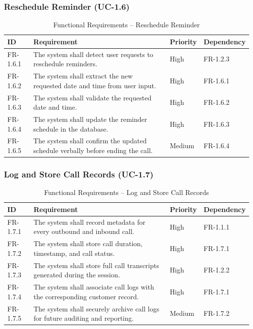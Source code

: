 \documentclass[12pt,a4paper]{report}
\begin{document}
\subsubsection{Reschedule Reminder (UC-1.6)}

\begin{table}[H]
\centering
\caption{Functional Requirements – Reschedule Reminder}
\begin{tabularx}{\textwidth}{|l|X|l|l|}
\hline
\textbf{ID} & \textbf{Requirement} & \textbf{Priority} & \textbf{Dependency} \\ \hline

FR-1.6.1 & The system shall detect user requests to reschedule reminders. & High & FR-1.2.3 \\ \hline

FR-1.6.2 & The system shall extract the new requested date and time from user input. & High & FR-1.6.1 \\ \hline

FR-1.6.3 & The system shall validate the requested date and time. & High & FR-1.6.2 \\ \hline

FR-1.6.4 & The system shall update the reminder schedule in the database. & High & FR-1.6.3 \\ \hline

FR-1.6.5 & The system shall confirm the updated schedule verbally before ending the call. & Medium & FR-1.6.4 \\ \hline

\end{tabularx}
\end{table}
\subsubsection{Log and Store Call Records (UC-1.7)}

\begin{table}[H]
\centering
\caption{Functional Requirements – Log and Store Call Records}
\begin{tabularx}{\textwidth}{|l|X|l|l|}
\hline
\textbf{ID} & \textbf{Requirement} & \textbf{Priority} & \textbf{Dependency} \\ \hline

FR-1.7.1 & The system shall record metadata for every outbound and inbound call. & High & FR-1.1.1 \\ \hline

FR-1.7.2 & The system shall store call duration, timestamp, and call status. & High & FR-1.7.1 \\ \hline

FR-1.7.3 & The system shall store full call transcripts generated during the session. & High & FR-1.2.2 \\ \hline

FR-1.7.4 & The system shall associate call logs with the corresponding customer record. & High & FR-1.7.1 \\ \hline

FR-1.7.5 & The system shall securely archive call logs for future auditing and reporting. & Medium & FR-1.7.2 \\ \hline

\end{tabularx}
\end{table}
\end{document}
